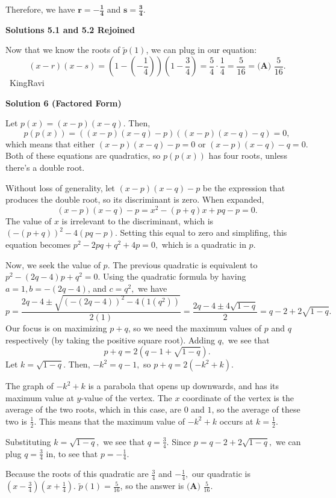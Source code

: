 \begin{enumerate}
 Therefore, we have $\boldsymbol{r=-\frac{1}{4}}$ and $\boldsymbol{s=\frac{3}{4}}$.

 



\textbf{Solutions 5.1 and 5.2 Rejoined}

Now that we know the roots of $\tilde{p}(1)$, we can plug in our equation: 
 \[(x-r)(x-s) = \left(1-\left(-\frac{1}{4}\right)\right)\left(1-\frac{3}{4}\right) = \frac{5}{4} \cdot \frac{1}{4} = \frac{5}{16} = \boxed{\textbf{(A) } \frac{5}{16}}.\]~KingRavi

 



\textbf{Solution 6 (Factored Form)}

Let $p(x)=(x-p)(x-q).$ Then, 
 \[p(p(x))=((x-p)(x-q)-p)((x-p)(x-q)-q)=0,\] which means that either $(x-p)(x-q)-p=0$ or $(x-p)(x-q)-q=0$. Both of these equations are quadratics, so $p(p(x))$ has four roots, unless there's a double root. 

 Without loss of generality, let $(x-p)(x-q)-p$ be the expression that produces the double root, so its discriminant is zero. When expanded, 
 \[(x-p)(x-q)-p=x^2-(p+q)x+pq-p=0.\] The value of $x$ is irrelevant to the discriminant, which is $(-(p+q))^2-4(pq-p).$ Setting this equal to zero and simplifing, this equation becomes $p^2-2pq+q^2+4p=0,$ which is a quadratic in $p$.

 
Now, we seek the value of $p$. The previous quadratic is equivalent to $p^2-(2q-4)p+q^2=0$. Using the quadratic formula by having $a=1, b=-(2q-4)$, and $c=q^2,$ we have
 \[p = \frac{2q-4\pm\sqrt{(-(2q-4))^2-4(1(q^2))}}{2(1)} = \frac{2q-4\pm4\sqrt{1-q}}{2}=q-2+2\sqrt{1-q}.\]Our focus is on maximizing $p+q$, so we need the maximum values of $p$ and $q$ respectively (by taking the positive square root). Adding $q,$ we see that
 \[p+q=2\left(q-1+\sqrt{1-q}\right).\]Let $k=\sqrt{1-q}.$ Then, $-k^2=q-1,$ so $p+q=2(-k^2+k).$ 

 
The graph of $-k^2+k$ is a parabola that opens up downwards, and has its maximum value at $y$-value of the vertex. The $x$ coordinate of the vertex is the average of the two roots, which in this case, are $0$ and $1$, so the average of these two is $\frac{1}{2}$. This means that the maximum value of $-k^2+k$ occurs at $k=\frac{1}{2}.$ 

 
Substituting $k=\sqrt{1-q},$ we see that $q=\frac{3}{4}.$ Since $p=q-2+2\sqrt{1-q},$ we can plug $q=\frac{3}{4}$ in, to see that $p=-\frac{1}{4}.$

 
Because the roots of this quadratic are $\frac{3}{4}$ and $-\frac{1}{4},$ our quadratic is $\left(x-\frac{3}{4}\right)\left(x+\frac{1}{4}\right).$ $\tilde{p}(1)=\frac{5}{16}$, so the answer is $\boxed{\textbf{(A) } \frac{5}{16}}$.


\end{enumerate}
